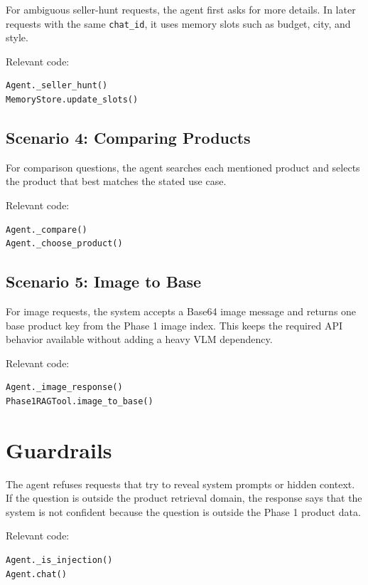 \documentclass[12pt,a4paper]{article}
\begin{document}
For ambiguous seller-hunt requests, the agent first asks for more details. In later requests with the same \texttt{chat\_id}, it uses memory slots such as budget, city, and style.

Relevant code:

\begin{lstlisting}
Agent._seller_hunt()
MemoryStore.update_slots()
\end{lstlisting}

\subsection{Scenario 4: Comparing Products}

For comparison questions, the agent searches each mentioned product and selects the product that best matches the stated use case.

Relevant code:

\begin{lstlisting}
Agent._compare()
Agent._choose_product()
\end{lstlisting}

\subsection{Scenario 5: Image to Base}

For image requests, the system accepts a Base64 image message and returns one base product key from the Phase 1 image index. This keeps the required API behavior available without adding a heavy VLM dependency.

Relevant code:

\begin{lstlisting}
Agent._image_response()
Phase1RAGTool.image_to_base()
\end{lstlisting}

\section{Guardrails}

The agent refuses requests that try to reveal system prompts or hidden context. If the question is outside the product retrieval domain, the response says that the system is not confident because the question is outside the Phase 1 product data.

Relevant code:

\begin{lstlisting}
Agent._is_injection()
Agent.chat()
\end{lstlisting}
\end{document}
